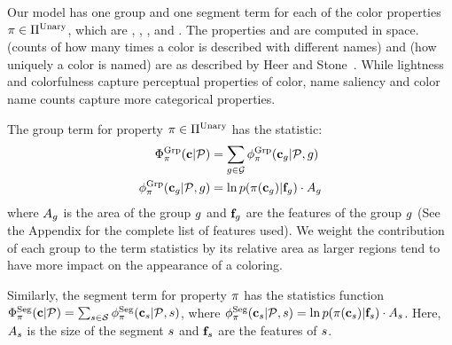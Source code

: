 Our model has one group and one segment term for each of the color properties $ \pi \in \Pi^{\textrm{Unary}}$, which are , , , and .
The properties  and  are computed in \lab space.  (counts of how many times a color is described with different names) and  (how uniquely a color is named) are as described by Heer and Stone~. While lightness and colorfulness capture perceptual properties of color, name saliency and color name counts capture more categorical properties.

The group term for property $\pi \in \Pi^{\textrm{Unary}}$ has the statistic:
\begin{align*}
 \Phi^{\textrm{Grp}}_\pi(\mathbf{c}|\mathcal{P}) &= \sum_{g \in \mathcal{G}} \phi^{\textrm{Grp}}_\pi(\mathbf{c}_g | \mathcal{P}, g) \\
 \phi^{\textrm{Grp}}_\pi(\mathbf{c}_g | \mathcal{P}, g) &=  \ln p( \pi( \mathbf{c}_g ) | \mathbf{f}_g ) \cdot A_g
\end{align*}
where $A_g$ is the area of the group $g$ and $\mathbf{f}_g$ are the features of the group $g$ (See the Appendix for the complete list of features used). We weight the contribution of each group to the term statistics by its relative area as larger regions tend to have more impact on the appearance of a coloring.

Similarly, the segment term for property $\pi$ has the statistics function $\Phi^{\textrm{Seg}}_\pi(\mathbf{c}|\mathcal{P}) = \sum_{s \in \mathcal{S}} \phi^{\textrm{Seg}}_\pi(\mathbf{c}_s | \mathcal{P}, s)$, where $\phi^{\textrm{Seg}}_\pi(\mathbf{c}_s | \mathcal{P}, s) = \ln p( \pi( \mathbf{c}_s ) | \mathbf{f}_s) \cdot A_s$. Here, $A_s$ is the size of the segment $s$ and $\mathbf{f}_s$ are the features of $s$.

%
%

